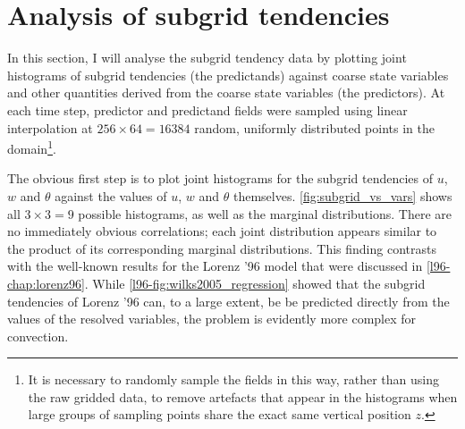 \documentclass[../main.tex]{subfiles}
\begin{document}
\section{Analysis of subgrid tendencies} \label{sec:subgrid_analysis}
In this section, I will analyse the subgrid tendency data by plotting joint
histograms of subgrid tendencies (the predictands) against coarse state
variables and other quantities derived from the coarse state variables (the
predictors). At each time step, predictor and predictand fields were sampled
using linear interpolation at $256 \times 64 = 16384$ random, uniformly
distributed points in the domain\footnote{It is necessary to randomly sample
the fields in this way, rather than using the raw gridded data, to remove
artefacts that appear in the histograms when large groups of sampling points
share the exact same vertical position $z$.}.

The obvious first step is to plot joint histograms for the subgrid tendencies
of $u$, $w$ and $\theta$ against the values of $u$, $w$ and $\theta$
themselves. \cref{fig:subgrid_vs_vars} shows all $3 \times 3 = 9$ possible
histograms, as well as the marginal distributions. There are no immediately
obvious correlations; each joint distribution appears similar to the product of
its corresponding marginal distributions. This finding contrasts with the
well-known results for the Lorenz '96 model that were discussed in
\cref{l96-chap:lorenz96}. While \cref{l96-fig:wilks2005_regression} showed that
the subgrid tendencies of Lorenz '96 can, to a large extent, be be predicted
directly from the values of the resolved variables, the problem is evidently
more complex for \rb{} convection.
\end{document}
